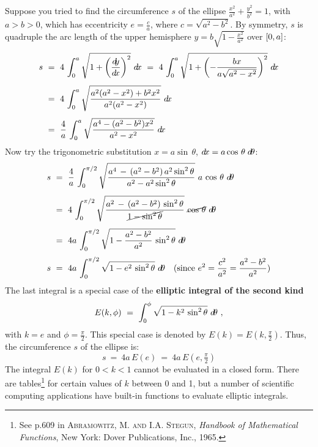 Suppose you tried to find the circumference $s$ of the ellipse
$\frac{x^2}{a^2}+\frac{y^2}{b^2}=1$, with $a>b>0$, which has eccentricity
$e=\frac{c}{a}$, where $c=\sqrt{a^2-b^2}$. By symmetry, $s$ is quadruple the arc
length of the upper hemisphere $y=b\sqrt{1-\frac{x^2}{a^2}}$ over $\lbrack 0,a \rbrack$:
\begin{align*}
s ~&=~ 4\,\int_0^{a} \sqrt{1 + \left(\frac{d\negmedspace y}{d\!x}\right)^2}~d\!x ~=~
       4\,\int_0^{a} \sqrt{1 + \left(-\frac{bx}{a \sqrt{a^2 - x^2}}\right)^2}~d\!x\\[4pt]
&=~ 4\,\int_0^{a} \sqrt{\frac{a^2 (a^2-x^2) + b^2x^2}{a^2 (a^2 - x^2)}}~d\!x\\[4pt]
&=~ \frac{4}{a}\,\int_0^{a} \sqrt{\frac{a^4 - (a^2-b^2) x^2}{a^2 - x^2}}~d\!x
\end{align*}
Now try the trigonometric substitution $x=a \sin\,\theta$,
$d\!x=a \cos\,\theta\;d\!\theta$:
\newpage
\begin{align*}
s ~&=~ \frac{4}{a}\,\int_0^{\pi/2} \sqrt{\frac{a^4 \,-\, (a^2-b^2)\,a^2 \sin^2 \theta}
        {a^2 - a^2 \sin^2 \theta}}~a\,\cos\,\theta~d\!\theta\\[4pt]
&=~ 4\,\int_0^{\pi/2} \sqrt{\frac{a^2 \,-\, (a^2-b^2)\,\sin^2 \theta}
        {\cancel{1 - \sin^2 \theta}}}~\cancel{\cos\,\theta}~d\!\theta\\[4pt]
&=~ 4a\,\int_0^{\pi/2} \sqrt{1 - \frac{a^2 - b^2}{a^2}\,\sin^2 \theta}~d\!\theta\\[3pt]
s ~&=~ 4a\,\int_0^{\pi/2} \sqrt{1 - e^2\,\sin^2 \theta}~d\!\theta
\quad\text{(since $e^2 = \frac{c^2}{a^2} = \frac{a^2 - b^2}{a^2}$)}
\end{align*}
The last integral is a special case of the \textbf{elliptic integral of the
second kind}
\[
E(k,\phi) ~=~ \int_0^{\phi} \sqrt{1 - k^2\,\sin^2 \theta}~d\!\theta ~,
\]
with $k=e$ and $\phi = \frac{\pi}{2}$. This special case is denoted by
$E(k) = E(k,\frac{\pi}{2})$. Thus, the circumference $s$ of the
ellipse is:
\[
s ~=~ 4a\,E(e) ~=~ 4a\,E(e,\tfrac{\pi}{2})
\]
The integral $E(k)$ for $0<k<1$ cannot be evaluated in a closed
form. There are tables\footnote{See p.609 in \textsc{Abramowitz, M. and
I.A. Stegun}, \emph{Handbook of Mathematical Functions}, New York: Dover
Publications, Inc., 1965.} for certain values of $k$ between 0 and 1, but a
number of scientific computing applications have built-in functions to evaluate
elliptic integrals.

